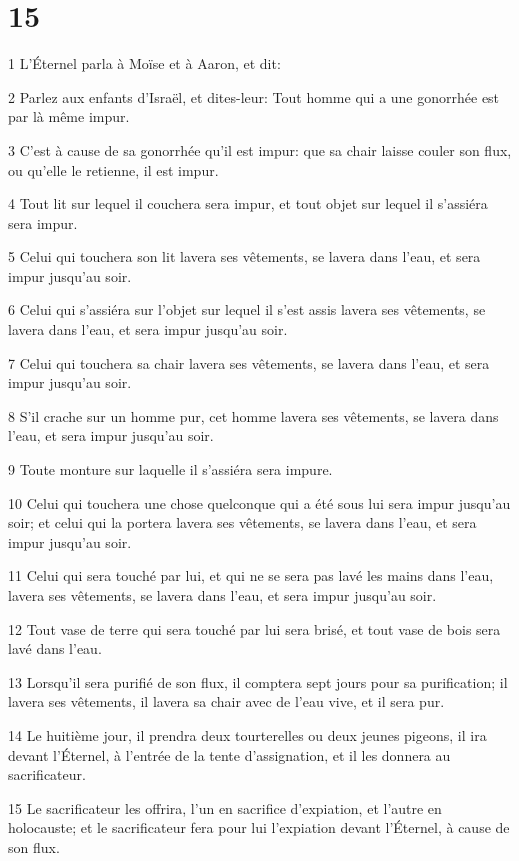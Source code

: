 \chapter{15}

\par 1 L'Éternel parla à Moïse et à Aaron, et dit:
\par 2 Parlez aux enfants d'Israël, et dites-leur: Tout homme qui a une gonorrhée est par là même impur.
\par 3 C'est à cause de sa gonorrhée qu'il est impur: que sa chair laisse couler son flux, ou qu'elle le retienne, il est impur.
\par 4 Tout lit sur lequel il couchera sera impur, et tout objet sur lequel il s'assiéra sera impur.
\par 5 Celui qui touchera son lit lavera ses vêtements, se lavera dans l'eau, et sera impur jusqu'au soir.
\par 6 Celui qui s'assiéra sur l'objet sur lequel il s'est assis lavera ses vêtements, se lavera dans l'eau, et sera impur jusqu'au soir.
\par 7 Celui qui touchera sa chair lavera ses vêtements, se lavera dans l'eau, et sera impur jusqu'au soir.
\par 8 S'il crache sur un homme pur, cet homme lavera ses vêtements, se lavera dans l'eau, et sera impur jusqu'au soir.
\par 9 Toute monture sur laquelle il s'assiéra sera impure.
\par 10 Celui qui touchera une chose quelconque qui a été sous lui sera impur jusqu'au soir; et celui qui la portera lavera ses vêtements, se lavera dans l'eau, et sera impur jusqu'au soir.
\par 11 Celui qui sera touché par lui, et qui ne se sera pas lavé les mains dans l'eau, lavera ses vêtements, se lavera dans l'eau, et sera impur jusqu'au soir.
\par 12 Tout vase de terre qui sera touché par lui sera brisé, et tout vase de bois sera lavé dans l'eau.
\par 13 Lorsqu'il sera purifié de son flux, il comptera sept jours pour sa purification; il lavera ses vêtements, il lavera sa chair avec de l'eau vive, et il sera pur.
\par 14 Le huitième jour, il prendra deux tourterelles ou deux jeunes pigeons, il ira devant l'Éternel, à l'entrée de la tente d'assignation, et il les donnera au sacrificateur.
\par 15 Le sacrificateur les offrira, l'un en sacrifice d'expiation, et l'autre en holocauste; et le sacrificateur fera pour lui l'expiation devant l'Éternel, à cause de son flux.
